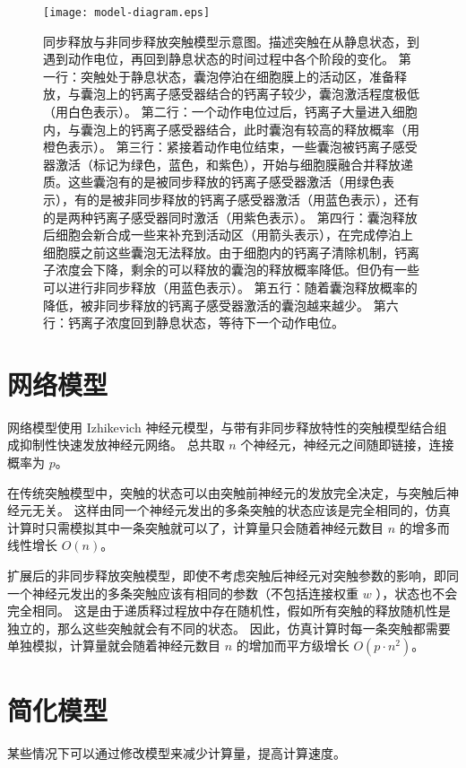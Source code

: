 \begin{figure}
\centering
\texttt{[image: model-diagram.eps]}
\caption{同步释放与非同步释放突触模型示意图。描述突触在从静息状态，到遇到动作电位，再回到静息状态的时间过程中各个阶段的变化。
第一行：突触处于静息状态，囊泡停泊在细胞膜上的活动区，准备释放，与囊泡上的钙离子感受器结合的钙离子较少，囊泡激活程度极低（用白色表示）。
第二行：一个动作电位过后，钙离子大量进入细胞内，与囊泡上的钙离子感受器结合，此时囊泡有较高的释放概率（用橙色表示）。
第三行：紧接着动作电位结束，一些囊泡被钙离子感受器激活（标记为绿色，蓝色，和紫色），开始与细胞膜融合并释放递质。这些囊泡有的是被同步释放的钙离子感受器激活（用绿色表示），有的是被非同步释放的钙离子感受器激活（用蓝色表示），还有的是两种钙离子感受器同时激活（用紫色表示）。
第四行：囊泡释放后细胞会新合成一些来补充到活动区（用箭头表示），在完成停泊上细胞膜之前这些囊泡无法释放。由于细胞内的钙离子清除机制，钙离子浓度会下降，剩余的可以释放的囊泡的释放概率降低。但仍有一些可以进行非同步释放（用蓝色表示）。
第五行：随着囊泡释放概率的降低，被非同步释放的钙离子感受器激活的囊泡越来越少。
第六行：钙离子浓度回到静息状态，等待下一个动作电位。}
\label{figure:model-diagram}
\end{figure}

\section{网络模型}
\label{section:model:network-model}
网络模型使用 Izhikevich 神经元模型，与带有非同步释放特性的突触模型结合组成抑制性快速发放神经元网络。
总共取 $n$ 个神经元，神经元之间随即链接，连接概率为 $p$。

在传统突触模型中，突触的状态可以由突触前神经元的发放完全决定，与突触后神经元无关。
这样由同一个神经元发出的多条突触的状态应该是完全相同的，仿真计算时只需模拟其中一条突触就可以了，计算量只会随着神经元数目 $n$ 的增多而线性增长 $O(n)$。

扩展后的非同步释放突触模型，即使不考虑突触后神经元对突触参数的影响，即同一个神经元发出的多条突触应该有相同的参数（不包括连接权重 $w$ ），状态也不会完全相同。
这是由于递质释过程放中存在随机性，假如所有突触的释放随机性是独立的，那么这些突触就会有不同的状态。
因此，仿真计算时每一条突触都需要单独模拟，计算量就会随着神经元数目 $n$ 的增加而平方级增长 $O(p \cdot n^2)$。


\section{简化模型}
\label{section:model:simplified-model}
某些情况下可以通过修改模型来减少计算量，提高计算速度。

